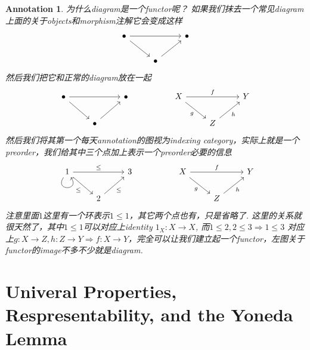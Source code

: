 \documentclass{article}
\newtheorem{annotation}[theorem]{Annotation}
\begin{document}
\begin{annotation}
\rm 为什么diagram是一个functor呢？ 如果我们抹去一个常见diagram上面的关于objects和morphism注解它会变成这样
$$
\begin{tikzcd}
\bullet \arrow[rr] \arrow[rd] &                    & \bullet \\
                              & \bullet \arrow[ru] &        
\end{tikzcd}
$$
然后我们把它和正常的diagram放在一起
$$
\begin{tikzcd}
\bullet \arrow[rr] \arrow[rd] &                    & \bullet &  & X \arrow[rd, "g"'] \arrow[rr, "f"] &                    & Y \\
                              & \bullet \arrow[ru] &         &  &                                    & Z \arrow[ru, "h"'] &  
\end{tikzcd}
$$
然后我们将其第一个每天annotation的图视为indexing category，实际上就是一个preorder，我们给其中三个点加上表示一个preorder必要的信息
$$
\begin{tikzcd}
1 \arrow[rr, "\leq"] \arrow[rd, "\leq"'] \arrow[loop, distance=2em, in=305, out=235] &                       & 3 &  & X \arrow[rd, "g"'] \arrow[rr, "f"] &                    & Y \\
                                                                                     & 2 \arrow[ru, "\leq"'] &   &  &                                    & Z \arrow[ru, "h"'] &  
\end{tikzcd}
$$
注意里面$1$这里有一个环表示$1 \leq 1$，其它两个点也有，只是省略了. 这里的关系就很天然了，其中$1 \leq 1$可以对应上identity $1_X: X \to X$, 而$1 \leq 2 , 2 \leq 3 \Rightarrow 1 \leq 3$ 对应上$g: X\to Z, h: Z \to Y \Rightarrow f: X \to Y$，完全可以让我们建立起一个functor，左图关于functor的image不多不少就是diagram. 
\end{annotation}

\newpage
\section{Univeral Properties, Respresentability, and the Yoneda Lemma}
\end{document}
